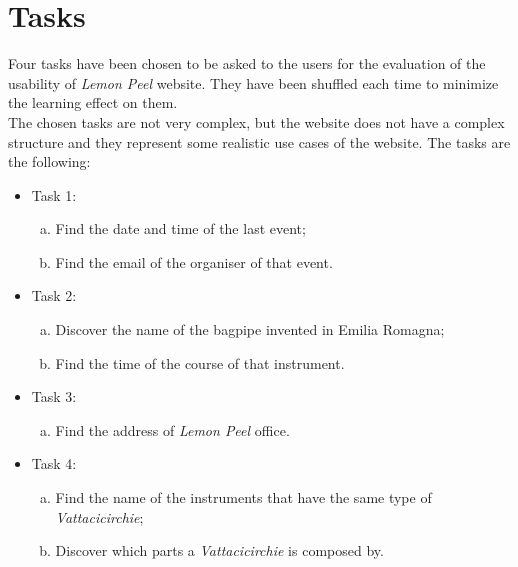 \documentclass[../../UsabilityReport.tex]{subfiles}
\begin{document}
\section{Tasks}
	Four tasks have been chosen to be asked to the users for the evaluation of the usability of \textit{Lemon Peel} website. They have been shuffled each time to minimize the learning effect on them.\\
	The chosen tasks are not very complex, but the website does not have a complex structure and they represent some realistic use cases of the website. The tasks are the following:
	\begin{itemize}
		\item Task 1:
			\begin{enumerate}[(a)]
				\item Find the date and time of the last event;
				\item Find the email of the organiser of that event.
			\end{enumerate}
		\item Task 2:
			\begin{enumerate}[(a)]
				\item Discover the name of the bagpipe invented in Emilia Romagna;
				\item Find the time of the course of that instrument.
			\end{enumerate}	
		\item Task 3:
			\begin{enumerate}[(a)]
				\item Find the address of \textit{Lemon Peel} office.
			\end{enumerate}
		\item Task 4:
			\begin{enumerate}[(a)]
				\item Find the name of the instruments that have the same type of \textit{Vattacicirchie};
				\item Discover which parts a \textit{Vattacicirchie} is composed by.
			\end{enumerate}
		\end{itemize}
\end{document}
